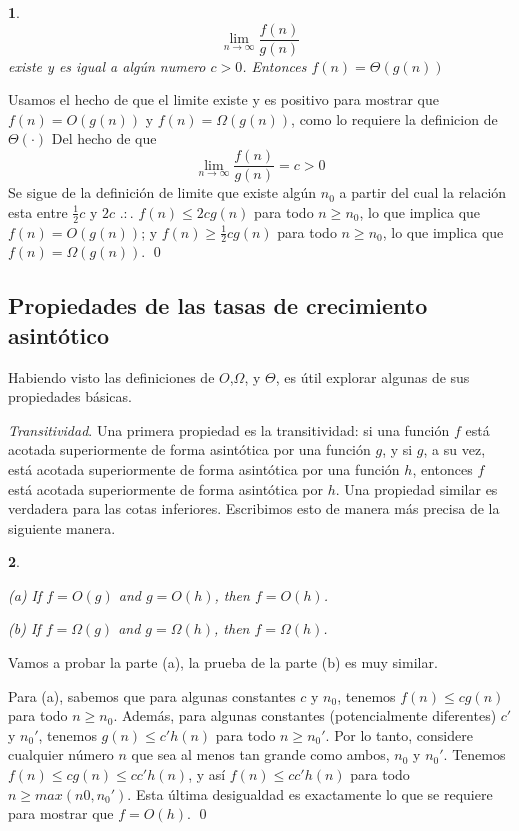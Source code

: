 \documentclass[a4paper, 12pt]{book}
\theoremstyle{dotless}
\newtheorem{theorem}{}%
\renewenvironment{proof}{{\noindent\bfseries Demostración.}}{\qed\vspace{12pt}}
\begin{document}
\begin{theorem}
%
$$\lim_{n \to \infty} \frac{f(n)}{g(n)}$$
%
existe y es igual a algún numero $c > 0$. Entonces $f(n) =  \Theta(g(n))$
\end{theorem}
%
\begin{proof}
Usamos el hecho de que el limite existe y es positivo para mostrar que $f(n) = O(g(n))$ y $f(n) = \Omega(g(n))$, como lo requiere la definicion de $\Theta(\cdot)$
%
Del hecho de que
%
$$\lim_{n \to \infty} \frac{f(n)}{g(n)} = c > 0$$
%
Se sigue de la definición de limite que existe algún $n_0$ a partir del cual la relación esta entre $\frac{1}{2}c$ y $2c$ $.:.$ $f(n) \leq 2c g(n)$ para todo $n \geq n_0$, lo que implica que $f(n) = O(g(n))$; y $f(n) \geq \frac{1}{2}c g(n)$ para todo $n \geq n_0$, lo que implica que $f(n) = \Omega(g(n))$.
%
\end{proof}


\subsection*{Propiedades de las tasas de crecimiento asintótico}

Habiendo visto las definiciones de $O$,$\Omega$, y $\Theta$, es útil explorar algunas de sus propiedades básicas.

\textit{Transitividad}. Una primera propiedad es la transitividad: si una función $f$ está acotada superiormente de forma asintótica por una función $g$, y si $g$, a su vez, está acotada superiormente de forma asintótica por una función $h$, entonces $f$ está acotada superiormente de forma asintótica por $h$. Una propiedad similar es verdadera para las cotas inferiores. Escribimos esto de manera más precisa de la siguiente manera.

\begin{theorem}
\label{thm:transitive}
{\hspace{12pt}}

(a) If \(f=O(g)\) and \(g=O(h)\), then \(f=O(h)\).

(b) If \(f=\Omega(g)\) and \(g=\Omega(h)\), then \(f=\Omega(h)\).
\end{theorem}

\begin{proof}
Vamos a probar la parte (a), la prueba de la parte (b) es muy similar. 

Para (a), sabemos que para algunas constantes $c$ y $n_0$, tenemos $f(n) \leq cg(n)$ para todo $n \geq n_0$. Además, para algunas constantes (potencialmente diferentes) $c'$ y $n_0'$, tenemos $g(n) \leq c'h(n)$ para todo $n \geq n_0'$. Por lo tanto, considere cualquier número $n$ que sea al menos tan grande como ambos, $n_0$ y $n_0'$. Tenemos $f(n) \leq cg(n) \leq cc'h(n)$, y así $f(n) \leq cc'h(n)$ para todo $n \geq max(n0, n_0')$. Esta última desigualdad es exactamente lo que se requiere para mostrar que $f=O(h)$.
\end{proof}
\end{document}
